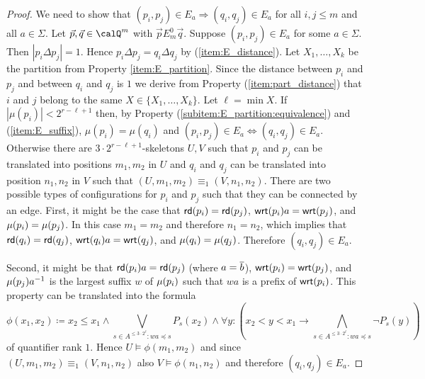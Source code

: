\begin{proof}
	We need to show that $(p_i,p_j)\in E_a \Rightarrow (q_i,q_j)\in E_a$  for all $i,j\leq m$ and all $a\in \Sigma$.
	Let $\vec{p}, \vec{q} \in \Qx^m$ with $\vec{p} E^0_m \vec{q}$. Suppose  $(p_i,p_j) \in E_a$ for some $a\in\Sigma$. Then $|p_i\Delta p_j| = 1$. Hence $p_i\Delta p_j = q_i\Delta q_j$ by (\ref{item:E_distance}). 
	Let $X_1,\ldots, X_k$ be the partition from Property \ref{item:E_partition}. Since the distance between $p_i$ and $p_j$ and between $q_i$ and $q_j$ is $1$ we derive from Property (\ref{item:part_distance}) that $i$ and $j$ belong to the same 
	$X\in\{X_1,\ldots, X_k\}$. Let $\ell = \min X$.
	If $|\mu(p_i)| < 2^{r -\ell +1}$ then, by Property (\ref{subitem:E_partition:equivalence}) and (\ref{item:E_suffix}), $\mu(p_i) = \mu(q_i)$ and $(p_i, p_j) \in E_a \Leftrightarrow (q_i,q_j) \in E_a$.
	Otherwise there are $3\cdot2^{r-\ell + 1}$-skeletons $U,V$ such that 
	$p_i$ and $p_j$ can be translated into positions $m_1, m_2$ in $U$ and $q_i$ and $q_j$ can be translated into position $n_1,n_2$ in $V$ such that $(U,m_1,m_2) \equiv_1 (V,n_1,n_2)$. 
	There are two possible types of configurations for $p_i$ and $p_j$ such that they can be connected by an edge. First, it might be the case  that $\mathsf{rd}(p_i) = \mathsf{rd}(p_j)$,
	$\mathsf{wrt}(p_i)a = \mathsf{wrt}(p_j)$, and $\mu(p_i) = \mu(p_j)$. In this case $m_1=m_2$ and therefore $n_1=n_2$, which implies that $\mathsf{rd}(q_i) = \mathsf{rd}(q_j)$,
	$\mathsf{wrt}(q_i)a = \mathsf{wrt}(q_j)$, and $\mu(q_i) = \mu(q_j)$. Therefore $(q_i,q_j) \in E_a$.
	
	Second, it might be that $\mathsf{rd}(p_i)a = \mathsf{rd}(p_j)$ (where $a=\overline{b}$),
	$\mathsf{wrt}(p_i) = \mathsf{wrt}(p_j)$, and $\mu(p_j)a^{-1}$ is the largest suffix $w$ of $\mu(p_i)$ such that $wa$ is a prefix of $\mathsf{wrt}(p_i)$.  This property can be translated into the formula 
	\[\phi(x_1, x_2) \coloneq x_2 \leq x_1 \land \bigvee_{s\in A^{\leq 3\cdot 2^\ell} : wa\preceq s} P_s(x_2) \land  \forall y: \left(x_2 < y < x_1 \to \bigwedge_{s\in A^{\leq 3\cdot 2^\ell} : wa\preceq s} \lnot P_s(y)\right)  \]
	of quantifier rank $1$. Hence $U \models \phi(m_1,m_2)$  and since $(U,m_1,m_2) \equiv_1 (V, n_1,n_2)$ also $V \models \phi(n_1, n_2)$ and therefore $(q_i,q_j)\in E_a$.
\end{proof}

